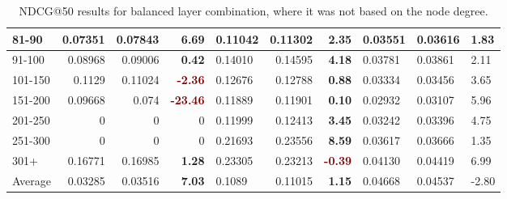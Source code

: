 \begin{table*}[h!]
\begin{tabular}{|l|r|r|r||l|r|r||l|l|l|}
        81-90   & 0.07351                                 & 0.07843                        & \textbf{\textcolor{OliveGreen}{6.69}}  & 0.11042 & 0.11302                  & \textbf{\textcolor{OliveGreen}{2.35}} & 0.03551 & 0.03616                & 1.83                   \\ \hline
        91-100  & 0.08968                                 & 0.09006                        & \textbf{\textcolor{OliveGreen}{0.42}}  & 0.14010 & 0.14595                  & \textbf{\textcolor{OliveGreen}{4.18}} & 0.03781 & 0.03861                & 2.11                   \\ \hline
        101-150 & 0.1129                                  & 0.11024                        & \textbf{\textcolor{Maroon}{-2.36}}     & 0.12676 & 0.12788                  & \textbf{\textcolor{OliveGreen}{0.88}} & 0.03334 & 0.03456                & 3.65                   \\ \hline
        151-200 & 0.09668                                 & 0.074                          & \textbf{\textcolor{Maroon}{-23.46}}    & 0.11889 & 0.11901                  & \textbf{\textcolor{OliveGreen}{0.10}} & 0.02932 & 0.03107                & 5.96                   \\ \hline
        201-250 & 0                                       & 0                              & 0                                      & 0.11999 & 0.12413                  & \textbf{\textcolor{OliveGreen}{3.45}} & 0.03242 & 0.03396                & 4.75                   \\ \hline
        251-300 & 0                                       & 0                              & 0                                      & 0.21693 & 0.23556                  & \textbf{\textcolor{OliveGreen}{8.59}} & 0.03617 & 0.03666                & 1.35                   \\ \hline
        301+    & 0.16771                                 & 0.16985                        & \textbf{\textcolor{OliveGreen}{1.28}}  & 0.23305 & 0.23213                  & \textbf{\textcolor{Maroon}{-0.39}}    & 0.04130 & 0.04419                & 6.99                   \\ \hline
        Average & 0.03285                                 & 0.03516                        & \textbf{\textcolor{OliveGreen}{7.03}}  & 0.1089  & 0.11015                  & \textbf{\textcolor{OliveGreen}{1.15}} & 0.04668 & 0.04537                & -2.80                  \\ \hline
    \end{tabular}
    \caption{NDCG@50 results for balanced layer combination, where it was not based on the node degree.}
    \label{tab:balanced-layer-combination-ndcg}
\end{table*}

